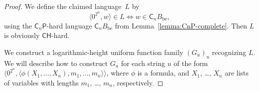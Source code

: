 \documentclass{lmcs}
\theoremstyle{definition}
\theoremstyle{remark}
\newcommand{\classP}{\mathsf{P}}
\newcommand{\classCH}{\mathsf{CH}}
\newcommand{\quantC}{\mathsf{C}}
\begin{document}
\begin{proof}
We define the claimed language~$L$ by
\begin{equation}
\label{equation: definition of padded CQBF}
 \langle 0^{2^n}, w \rangle \in L
 \iff
 w \in \quantC_n B_{\mathrm{be}}, 
\end{equation}
using the $\quantC _n \classP$-hard language $\quantC_n B_{\mathrm{be}}$ 
from Lemma~\ref{lemma:CnP-complete}. 
Then $L$ is obviously $\classCH$-hard. 

We construct a logarithmic-height uniform function family $(G_u)_u$
recognizing $L$.
We will describe how to construct $G _u$ 
for each string $u$ of the form $\langle 0^{2^n}, \allowbreak
\langle \phi(X_1, \dots, X_n), m_1, \dots, m_n \rangle \rangle$, 
where 
$\phi$ is a formula, and 
$X _1$, \ldots, $X _n$ are lists of variables
with lengths $m _1$, \ldots, $m _n$, respectively. 
 

\end{proof}
\end{document}

